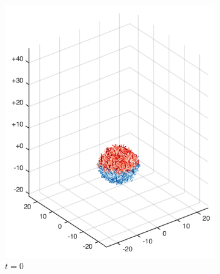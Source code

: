 \begin{figure}[htbp]
  \centering
  \begin{subfigure}[h]{0.24\textwidth}
    \centering
    \includegraphics[width=\textwidth]{img/mixing/top_00000.pdf}
    \caption{$t=0$}\label{fig:mixing_top_a}
  \end{subfigure}
  \begin{subfigure}[h]{0.24\textwidth}
    \centering

\end{subfigure}
\end{figure}
